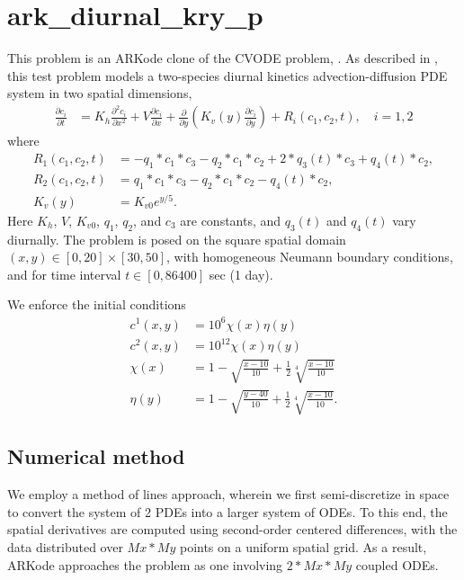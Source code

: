 \documentclass[letterpaper,10pt,english]{sphinxmanual}
\begin{document}
\section{ark\_diurnal\_kry\_p}
\label{\detokenize{c_parallel:ark-diurnal-kry-p}}\label{\detokenize{c_parallel:id3}}
This problem is an ARKode clone of the CVODE problem,
.  As described in \label{\detokenize{c_parallel:id4}}{\hyperref[\detokenize{References:hsr2017}]{\sphinxcrossref{{[}HSR2017{]}}}}, this test problem
models a two-species diurnal kinetics advection-diffusion PDE system
in two spatial dimensions,
\begin{equation*}
\begin{split}\frac{\partial c_i}{\partial t} &=
  K_h \frac{\partial^2 c_i}{\partial x^2} +
  V \frac{\partial     c_i}{\partial x} +
  \frac{\partial}{\partial y}\left( K_v(y)
  \frac{\partial c_i}{\partial y}\right) +
  R_i(c_1,c_2,t),\quad i=1,2\end{split}
\end{equation*}
where
\begin{equation*}
\begin{split}R_1(c_1,c_2,t) &= -q_1*c_1*c_3 - q_2*c_1*c_2 + 2*q_3(t)*c_3 + q_4(t)*c_2, \\
R_2(c_1,c_2,t) &=  q_1*c_1*c_3 - q_2*c_1*c_2 - q_4(t)*c_2, \\
K_v(y) &= K_{v0} e^{y/5}.\end{split}
\end{equation*}
Here \(K_h\), \(V\), \(K_{v0}\), \(q_1\), \(q_2\),
and \(c_3\) are constants, and \(q_3(t)\) and \(q_4(t)\)
vary diurnally.  The problem is posed on the square spatial domain
\((x,y) \in [0,20]\times[30,50]\), with homogeneous Neumann
boundary conditions, and for time interval \(t\in [0,86400]\) sec
(1 day).

We enforce the initial conditions
\begin{equation*}
\begin{split}c^1(x,y) &=  10^6 \chi(x)\eta(y) \\
c^2(x,y) &=  10^{12} \chi(x)\eta(y) \\
\chi(x) &= 1 - \sqrt{\frac{x - 10}{10}} + \frac12 \sqrt[4]{\frac{x - 10}{10}} \\
\eta(y) &= 1 - \sqrt{\frac{y - 40}{10}} + \frac12 \sqrt[4]{\frac{x - 10}{10}}.\end{split}
\end{equation*}

\subsection{Numerical method}
\label{\detokenize{c_parallel:id5}}
We employ a method of lines approach, wherein we first semi-discretize
in space to convert the system of 2 PDEs into a larger system of ODEs.
To this end, the spatial derivatives are computed using second-order
centered differences, with the data distributed over \(Mx*My\)
points on a uniform spatial grid.  As a result, ARKode approaches the
problem as one involving \(2*Mx*My\) coupled ODEs.
\end{document}
